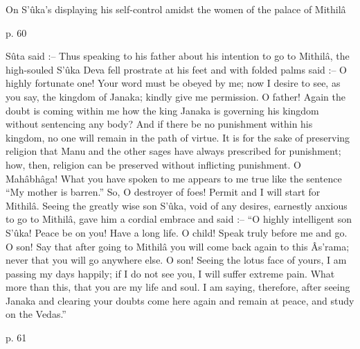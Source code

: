 On S’ûka’s displaying his self-control amidst the women of the palace of Mithilâ

 

p. 60

 

Sûta said :-- Thus speaking to his father about his intention to go to Mithilâ, the high-souled S’ûka Deva fell prostrate at his feet and with folded palms said :-- O highly fortunate one! Your word must be obeyed by me; now I desire to see, as you say, the kingdom of Janaka; kindly give me permission. O father! Again the doubt is coming within me how the king Janaka is governing his kingdom without sentencing any body? And if there be no punishment within his kingdom, no one will remain in the path of virtue. It is for the sake of preserving religion that Manu and the other sages have always prescribed for punishment; how, then, religion can be preserved without inflicting punishment. O Mahâbhâga! What you have spoken to me appears to me true like the sentence “My mother is barren.” So, O destroyer of foes! Permit and I will start for Mithilâ. Seeing the greatly wise son S’ûka, void of any desires, earnestly anxious to go to Mithilâ, gave him a cordial embrace and said :-- “O highly intelligent son S’ûka! Peace be on you! Have a long life. O child! Speak truly before me and go. O son! Say that after going to Mithilâ you will come back again to this Âs'rama; never that you will go anywhere else. O son! Seeing the lotus face of yours, I am passing my days happily; if I do not see you, I will suffer extreme pain. What more than this, that you are my life and soul. I am saying, therefore, after seeing Janaka and clearing your doubts come here again and remain at peace, and study on the Vedas.”

 

p. 61

 

